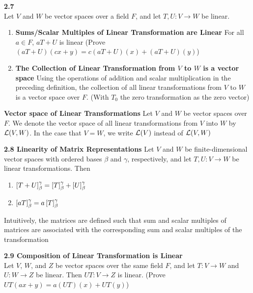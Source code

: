 \documentclass[11pt]{article}
\begin{document}
\begin{theorem*}
    \textbf{2.7} \\
    Let $V$ and $W$ be vector spaces over a field $F$, and let $T,U:V\to W$ be linear. 
    \begin{enumerate}
        \item \textbf{Sums/Scalar Multiples of Linear Transformation are Linear} For all $a\in F$, $aT+U$ is linear (Prove $(aT+U)(cx+y) = c(aT+U)(x)+(aT+U)(y)$)
        \item \textbf{The Collection of Linear Transformation from $V$ to $W$ is a vector space} Using the operations of addition and scalar multiplication in the preceding definition, the collection of all linear transformations from $V$ to $W$ is a vector space over $F$. (With $T_0$ the zero transformation as the zero vector)
    \end{enumerate}
\end{theorem*}

\begin{defn*}
    \textbf{Vector space of Linear Transformations} Let $V$ and $W$ be vector spaces over $F$. We denote the vector space of all linear transformations from $V$ into $W$ by $\mathcal{L}(V,W)$. In the case that $V=W$, we write $\mathcal{L}(V)$ instead of $\mathcal{L}(V,W)$
\end{defn*}

\begin{theorem*}
    \textbf{2.8 Linearity of Matrix Representations} Let $V$ and $W$ be finite-dimensional vector spaces with ordered bases $\beta$ and $\gamma$, respectively, and let $T,U:V\to W$ be linear transformations. Then 
    \begin{enumerate}
        \item $\left[ T+U \right]_{\beta}^{\gamma} = \left[ T \right]_{\beta}^{\gamma} + \left[ U \right]_{\beta}^{\gamma}$
        \item $\left[ aT \right]_{\beta}^{\gamma} = a\left[ T \right]_{\beta}^{\gamma}$ 
    \end{enumerate}
    Intuitively, the matrices are defined such that sum and scalar multiples of matrices are associated with the corresponding sum and scalar multiples of the transformation
\end{theorem*}




\begin{theorem*}
    \textbf{2.9 Composition of Linear Transformation is Linear} \\
    Let $V$, $W$, and $Z$ be vector spaces over the same field $F$, and let $T:V\to W$ and $U:W\to Z$ be linear. Then $UT:V\to Z$ is linear. (Prove $UT(ax+y)=a(UT)(x) + UT(y)$)
\end{theorem*}
\end{document}
